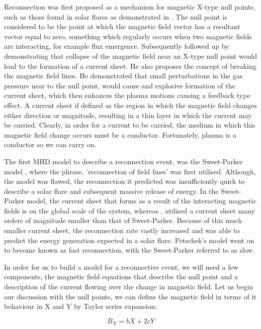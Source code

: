 Reconnection was first proposed as a mechanism for magnetic X-type null points, such as those found in solar flares as demonstrated in  \cite{Giovanelli1946}.
The null point is considered to be the point at which the magnetic field vector has a resultant vector equal to zero, something which regularly occurs when two magnetic fields are interacting, for example flux emergence.
Subsequently followed up by \cite{Dungey1953} demonstrating that collapse of the magnetic field near an X-type null point would lead to the formation of a current sheet.
He also proposes the concept of breaking the magnetic field lines.
He demonstrated that small perturbations in the gas pressure near to the null point, would cause and explosive formation of the current sheet, which then enhances the plasma motions causing a feedback type effect.
A current sheet if defined as the region in which the magnetic field changes either direction or magnitude, resulting in a thin layer in which the current may be carried.
Clearly, in order for a current to be carried, the medium in which this magnetic field change occurs must be a conductor.
Fortunately, plasma is a conductor so we can carry on. 

The first MHD model to describe a reconnection event, was the Sweet-Parker model \citep{Sweet1958, Parker1957}, where the phrase, 'reconnection of field lines' was first utilised.
Although, the model was flawed, the reconnection it predicted was insufficiently quick to describe a solar flare and subsequent massive release of energy.
In the Sweet-Parker model, the current sheet that forms as a result of the interacting magnetic fields is on the global scale of the system, whereas \cite{Petschek1964}, utilised a current sheet many orders of magnitude smaller than that of Sweet-Parker.
Because of this much smaller current sheet, the reconnection rate vastly increased and was able to predict the energy generation expected in a solar flare. 
Petschek's model went on to become known as fast reconnection, with the Sweet-Parker referred to as slow.

In order for us to build a model for a reconnective event, we will need a few components, the magnetic field equations that describe the null point and a description of the current flowing over the change in magnetic field.
Let us begin our discussion with the null points, we can define the magnetic field in terms of it behaviour in X and Y by Taylor series expansion;

\begin{equation}
	B_X = bX + 2cY
\end{equation}	
	

